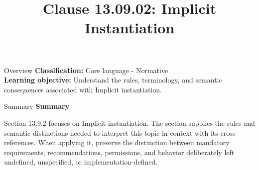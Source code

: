\documentclass[10pt,letterpaper]{article}
\title{Clause 13.09.02: Implicit Instantiation}
\author{}
\date{}
\begin{document}
\maketitle
\begin{CornellOverviewBox}{Overview}
\textbf{Classification:} Core language - Normative\\[2pt]
\textbf{Learning objective:} Understand the rules, terminology, and semantic consequences associated with Implicit instantiation.
\end{CornellOverviewBox}\begin{CornellSummaryBox}{Summary}
{\sffamily\bfseries\color{Accent} Summary}\par\vspace{3pt}Section 13.9.2 focuses on Implicit instantiation. The section supplies the rules and semantic distinctions needed to interpret this topic in context with its cross-references. When applying it, preserve the distinction between mandatory requirements, recommendations, permissions, and behavior deliberately left undefined, unspecified, or implementation-defined.
\end{CornellSummaryBox}
\end{document}
